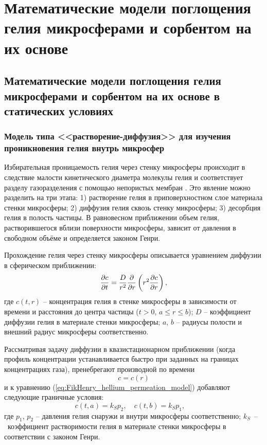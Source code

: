 \chapter{Математические модели поглощения гелия микросферами и сорбентом на их основе}
 \label{section_2}

\section{Математические модели поглощения гелия микросферами и сорбентом на их основе в статических условиях}
 \label{section_2_1}
 
\subsection{Модель типа <<растворение-диффузия>> для изучения проникновения гелия внутрь микросфер}
 \label{section_2_1_1}
 
Избирательная проницаемость гелия через стенку микросферы происходит в следствие малости кинетического диаметра молекулы гелия и соответствует разделу газоразделения с помощью непористых мембран \cite{Mulder}. Это явление можно разделить на три этапа: 1) растворение гелия в приповерхностном слое материала стенки микросферы; 2) диффузия гелия сквозь стенку микросферы; 3) десорбция гелия в полость частицы. В равновесном приближении объем гелия, растворившегося вблизи поверхности микросферы, зависит от давления в свободном объёме и определяется законом Генри. 

Прохождение гелия через стенку микросферы описывается уравнением диффузии в сферическом приближении:
\begin{equation}
\label{eq:FikHenry_hellium_permeation_model}
\frac{\partial c}{\partial t}=\frac{D}{r^2}\frac{\partial }{\partial r}\left( r^2 \frac{\partial c}{\partial r} \right),
\end{equation}
где $c(t,r)$ -- концентрация гелия в стенке микросферы в зависимости от времени и расстояния до центра частицы ($t > 0$, $a \leq r \leq b$); $D$ -- коэффициент диффузии гелия в материале стенки микросферы; $a$, $b$ -- радиусы полости и внешний радиус микросферы соответственно. 

Рассматривая задачу диффузии в квазистационарном приближении (когда профиль концентрации устанавливается быстро при заданных на границах концентрациях газа), пренебрегают производной по времени 
\begin{equation}
\label{eq:FikHenry_hellium_permeation_model_quasistat}
c = c(r)
\end{equation}
и к уравнению (\ref{eq:FikHenry_hellium_permeation_model}) добавляют следующие граничные условия:
\begin{equation}
\label{eq:FikHenry_hellium_permeation_model_conditions}
c(t, a)  = k_S p_2,\quad
c(t, b)  = k_S p_1,\quad
\end{equation}
где $p_1$, $p_2$ -- давления гелия снаружи и внутри микросферы соответственно; $k_S$~--~коэффициент растворимости гелия в материале стенки микросферы в соответствии с законом Генри.

